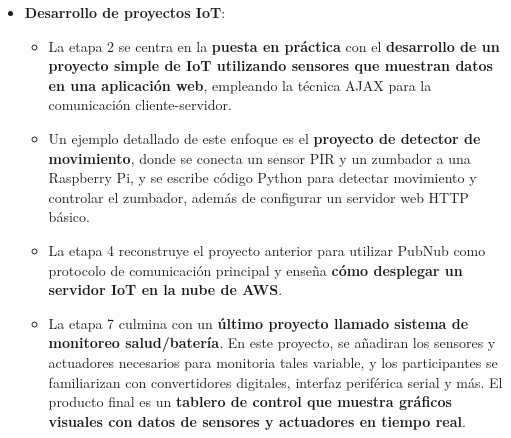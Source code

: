\documentclass{report}
\begin{document}
\begin{itemize}
    \item \textbf{Desarrollo de proyectos IoT}:
    \begin{itemize}
        \item La etapa 2 se centra en la \textbf{puesta en práctica} con el \textbf{desarrollo de un proyecto simple de IoT 
        utilizando sensores que muestran datos en una aplicación web}, empleando la técnica AJAX para la comunicación cliente-servidor.
        \item Un ejemplo detallado de este enfoque es el \textbf{proyecto de detector de movimiento}, donde se conecta 
        un sensor PIR y un zumbador a una Raspberry Pi, y se escribe código Python para detectar movimiento y controlar el zumbador, 
        además de configurar un servidor web HTTP básico.
        \item La etapa 4 reconstruye el proyecto anterior para utilizar PubNub como protocolo de comunicación principal y enseña 
        \textbf{cómo desplegar un servidor IoT en la nube de AWS}.
        \item La etapa 7 culmina con un \textbf{último proyecto llamado sistema de monitoreo salud/batería}. En este proyecto, se 
        añadiran los sensores y actuadores necesarios para monitoria tales variable, y los participantes se familiarizan con 
        convertidores digitales, interfaz periférica serial y más. El producto final es un \textbf{tablero de control 
        que muestra gráficos visuales con datos de sensores y actuadores en tiempo real}.
    \end{itemize}


\end{itemize}
\end{document}
